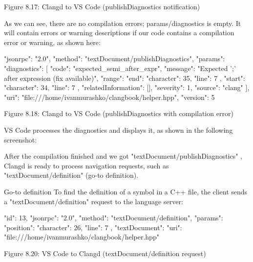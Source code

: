 \begin{center}
Figure 8.17: Clangd to VS Code (publishDiagnostics notification)
\end{center}

As we can see, there are no compilation errors; params/diagnostics is empty. It will contain errors or warning descriptions if our code contains a compilation error or warning, as shown here:

\begin{shell}
{
  "jsonrpc": "2.0",
  "method": "textDocument/publishDiagnostics",
  "params": {
    "diagnostics": [
    {
      "code": "expected_semi_after_expr",
      "message": "Expected ';' after expression (fix available)",
      "range": {
        "end": {
          "character": 35,
          "line": 7
        },
        "start": {
          "character": 34,
          "line": 7
        }
      },
      "relatedInformation": [],
      "severity": 1,
      "source": "clang"
    }
    ],
    "uri": "file:///home/ivanmurashko/clangbook/helper.hpp",
    "version": 5
  }
}
\end{shell}

\begin{center}
Figure 8.18: Clangd to VS Code (publishDiagnostics with compilation error)
\end{center}

VS Code processes the diagnostics and displays it, as shown in the following screenshot:


After the compilation finished and we got "textDocument/publishDiagnostics" , Clangd is ready to process navigation requests, such as "textDocument/definition" (go-to definition).

Go-to definition
To find the definition of a symbol in a C++ file, the client sends a "textDocument/definition" request to the language server:

\begin{shell}
{
  "id": 13,
  "jsonrpc": "2.0",
  "method": "textDocument/definition",
  "params": {
    "position": {
      "character": 26,
      "line": 7
    },
    "textDocument": {
       "uri": "file:///home/ivanmurashko/clangbook/helper.hpp"
    }
  }
}
\end{shell}

\begin{center}
Figure 8.20: VS Code to Clangd (textDocument/definition request)
\end{center}

